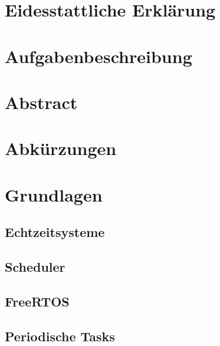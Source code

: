 \documentclass{scrartcl}
\begin{document}
	\begin{titlepage}
		
	\end{titlepage}
	\clearpage 
	\section*{Eidesstattliche Erklärung}
		
		\clearpage
	\section*{Aufgabenbeschreibung}
		
		\clearpage
	\section*{Abstract}
		
		\clearpage
	\tableofcontents
		\clearpage
	\section*{Abkürzungen}
		
		\clearpage
	\section{Grundlagen}
		
		\subsection{Echtzeitsysteme}
			
		\subsection{Scheduler}
			
		\subsection{FreeRTOS}
			
		\subsection{Periodische Tasks}
			
		\clearpage
	\listoffigures
		\clearpage
	\listoftables
		\printbibliography{}
		\clearpage
\end{document}
